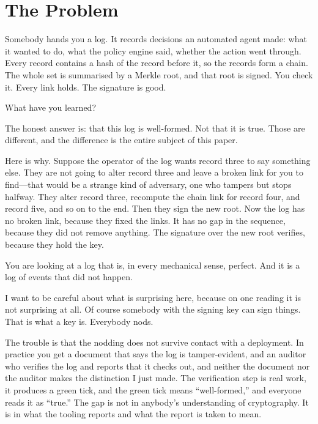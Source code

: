 \documentclass[11pt]{article}
\begin{document}
\clearpage


\section{The Problem}
\label{sec:problem}

Somebody hands you a log. It records decisions an automated agent made:
what it wanted to do, what the policy engine said, whether the action went
through. Every record contains a hash of the record before it, so the records
form a chain. The whole set is summarised by a Merkle root, and that root is
signed. You check it. Every link holds. The signature is good.

What have you learned?

The honest answer is: that this log is well-formed. Not that it is true. Those
are different, and the difference is the entire subject of this paper.

Here is why. Suppose the operator of the log wants record three to say
something else. They are not going to alter record three and leave a broken
link for you to find---that would be a strange kind of adversary, one who
tampers but stops halfway. They alter record three, recompute the chain link
for record four, and record five, and so on to the end. Then they sign the new
root. Now the log has no broken link, because they fixed the links. It has no
gap in the sequence, because they did not remove anything. The signature over
the new root verifies, because they hold the key.

You are looking at a log that is, in every mechanical sense, perfect. And it is
a log of events that did not happen.

I want to be careful about what is surprising here, because on one reading it
is not surprising at all. Of course somebody with the signing key can sign
things. That is what a key is. Everybody nods.

The trouble is that the nodding does not survive contact with a deployment. In
practice you get a document that says the log is tamper-evident, and an
auditor who verifies the log and reports that it checks out, and neither the
document nor the auditor makes the distinction I just made. The verification
step is real work, it produces a green tick, and the green tick means
``well-formed,'' and everyone reads it as ``true.'' The gap is not in anybody's
understanding of cryptography. It is in what the tooling reports and what the
report is taken to mean.
\end{document}
